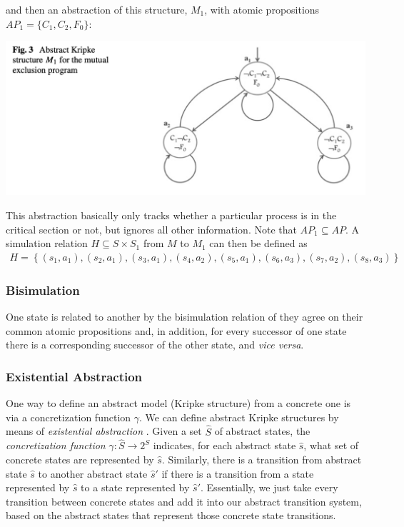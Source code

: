 \documentclass[10pt,a4paper]{article}
\begin{document}
and then an abstraction of this structure, $M_1$, with atomic propositions $AP_1=\{C_1,C_2,F_0\}$:
\begin{center}
    \includegraphics[scale=0.35]{images/abstract-mutex.png}
\end{center}
This abstraction basically only tracks whether a particular process is in the critical section or not, but ignores all other information. Note that $AP_1 \subseteq AP$. A simulation relation $H \subseteq S \times S_1$ from $M$ to $M_1$ can then be defined as 
\begin{align*}
    H = \left\lbrace (s_1, a_1), (s_2, a_1), (s_3, a_1), (s_4, a_2), (s_5, a_1), (s_6, a_3), (s_7, a_2), (s_8, a_3) \right\rbrace
\end{align*}

\subsubsection*{Bisimulation}

One state is related to another by the bisimulation relation of they agree on their common atomic propositions and, in addition, for every successor of one state there is a corresponding successor of the other state, and \textit{vice versa}.

\subsubsection*{Existential Abstraction}

One way to define an abstract model (Kripke structure) from a concrete one is via a concretization function $\gamma$. We can define abstract Kripke structures by means of \textit{existential abstraction} \cite{94mcabs}. Given a set $\widehat{S}$ of abstract states, the \textit{concretization function} $\gamma : \widehat{S} \rightarrow 2^S$ indicates, for each abstract state $\widehat{s}$, what set of concrete states are represented by $\widehat{s}$. Similarly, there is a transition from abstract state $\widehat{s}$ to another abstract state $\widehat{s}'$ if there is a transition from a state represented by $\widehat{s}$ to a state represented by $\widehat{s}'$. Essentially, we just take every transition between concrete states and add it into our abstract transition system, based on the abstract states that represent those concrete state transitions.
\end{document}
